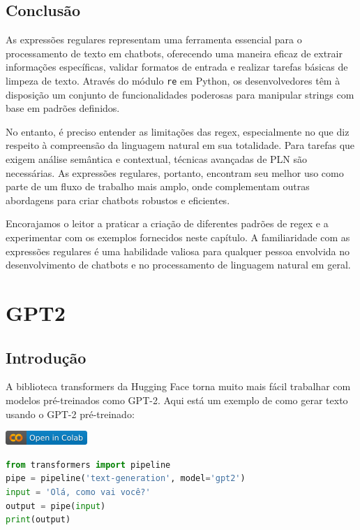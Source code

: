 \documentclass[14pt,a4paper,oneside]{book}
\begin{document}
\section{Conclusão}
As expressões regulares representam uma ferramenta essencial para o processamento de texto em chatbots, oferecendo uma maneira eficaz de extrair informações específicas, validar formatos de entrada e realizar tarefas básicas de limpeza de texto. Através do módulo \texttt{re} em Python, os desenvolvedores têm à disposição um conjunto de funcionalidades poderosas para manipular strings com base em padrões definidos.

No entanto, é preciso entender as limitações das regex, especialmente no que diz respeito à compreensão da linguagem natural em sua totalidade. Para tarefas que exigem análise semântica e contextual, técnicas avançadas de PLN são necessárias. As expressões regulares, portanto, encontram seu melhor uso como parte de um fluxo de trabalho mais amplo, onde complementam outras abordagens para criar chatbots robustos e eficientes.

Encorajamos o leitor a praticar a criação de diferentes padrões de regex e a experimentar com os exemplos fornecidos neste capítulo. A familiaridade com as expressões regulares é uma habilidade valiosa para qualquer pessoa envolvida no desenvolvimento de chatbots e no processamento de linguagem natural em geral.



\chapter{GPT2}

\section{Introdução}

A biblioteca transformers da Hugging Face torna muito mais fácil trabalhar com modelos pré-treinados como GPT-2. Aqui está um exemplo de como gerar texto usando o GPT-2 pré-treinado:

\vspace{\baselineskip}
\href{https://colab.research.google.com/github/giseldo/chatbotbook/blob/main/notebook/cap12.ipynb}{
  \includegraphics{./fig/colab-badge.png}
}

\begin{lstlisting}[language=Python, caption=Exemplo de uso do GPT-2 com a biblioteca transformers, label=lst:gpt2_exemplo]
from transformers import pipeline
pipe = pipeline('text-generation', model='gpt2')
input = 'Olá, como vai você?'
output = pipe(input)
print(output)
\end{lstlisting}
\end{document}
